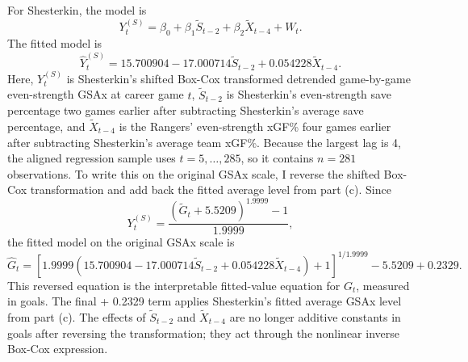 \documentclass[
  10pt,
]{extarticle}
\newenvironment{Shaded}{\begin{snugshade}}{\end{snugshade}}
\newcommand{\NormalTok}[1]{#1}
\newcommand{\SpecialCharTok}[1]{\textcolor[rgb]{0.81,0.36,0.00}{\textbf{#1}}}
\begin{document}
For Shesterkin, the model is
\[
Y^{(S)}_t = \beta_0 + \beta_1 \tilde{S}_{t-2} + \beta_2 \tilde{X}_{t-4} + W_t.
\]
The fitted model is
\[
\widehat{Y}^{(S)}_t = 15.700904 - 17.000714 \tilde{S}_{t-2} + 0.054228 \tilde{X}_{t-4}.
\]
Here, \(Y^{(S)}_t\) is Shesterkin's shifted Box-Cox transformed detrended game-by-game even-strength GSAx at career game \(t\), \(\tilde{S}_{t-2}\) is Shesterkin's even-strength save percentage two games earlier after subtracting Shesterkin's average save percentage, and \(\tilde{X}_{t-4}\) is the Rangers' even-strength xGF\% four games earlier after subtracting Shesterkin's average team xGF\%. Because the largest lag is 4, the aligned regression sample uses \(t = 5,\ldots,285\), so it contains \(n=281\) observations. To write this on the original GSAx scale, I reverse the shifted Box-Cox transformation and add back the fitted average level from part (c). Since
\[
Y^{(S)}_t
= \frac{\left(\tilde{G}_t + 5.5209\right)^{1.9999} - 1}{1.9999},
\]
the fitted model on the original GSAx scale is
\[
\widehat{G}_t
=
\left[
1.9999
\left(15.700904 - 17.000714 \tilde{S}_{t-2} + 0.054228 \tilde{X}_{t-4}\right)
+ 1
\right]^{1/1.9999}
- 5.5209
+ 0.2329.
\]
This reversed equation is the interpretable fitted-value equation for \(G_t\), measured in goals. The final + 0.2329 term applies Shesterkin's fitted average GSAx level from part (c). The effects of \(\tilde{S}_{t-2}\) and \(\tilde{X}_{t-4}\) are no longer additive constants in goals after reversing the transformation; they act through the nonlinear inverse Box-Cox expression.

\begin{center}
\scriptsize
\begin{table}[H]

\caption{\label{tab:p1-shesterkin-reg-comparison}Shesterkin detrended-response and transformed-detrended-response regression comparison}
\centering
{}
\end{table}
\normalsize
\end{center}

\begin{Shaded}
\end{Shaded}
\end{document}
